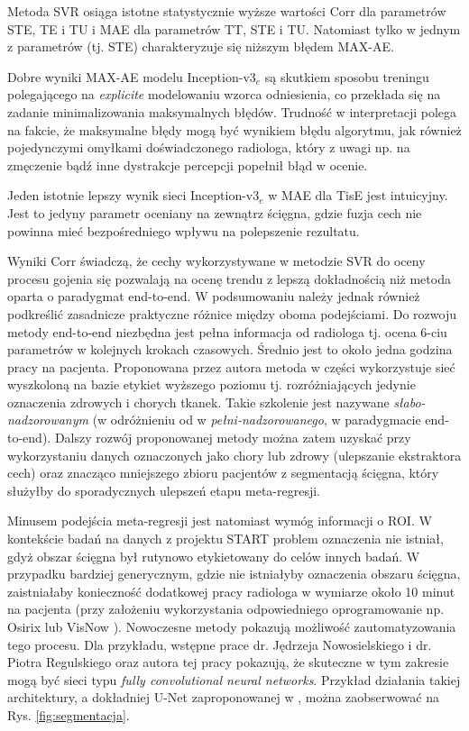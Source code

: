 Metoda SVR osiąga istotne statystycznie wyższe wartości Corr dla parametrów STE, TE i TU i MAE dla parametrów TT, STE i TU. Natomiast tylko w jednym z parametrów (tj. STE) charakteryzuje się niższym błędem MAX-AE. 

Dobre wyniki MAX-AE modelu Inception-v3$_{e}$ są skutkiem sposobu treningu polegającego na \textit{explicite} modelowaniu wzorca odniesienia, co przekłada się na zadanie minimalizowania maksymalnych błędów. Trudność w interpretacji polega na fakcie, że maksymalne błędy mogą być wynikiem błędu algorytmu, jak również pojedynczymi omyłkami doświadczonego radiologa, który z uwagi np. na zmęczenie bądź inne dystrakcje percepcji popełnił błąd w ocenie.

Jeden istotnie lepszy wynik sieci Inception-v3$_e$ w MAE dla TisE jest intuicyjny. Jest to jedyny parametr oceniany na zewnątrz ścięgna, gdzie fuzja cech nie powinna mieć bezpośredniego wpływu na polepszenie rezultatu. 

Wyniki Corr świadczą, że cechy wykorzystywane w metodzie SVR do oceny procesu gojenia się pozwalają na ocenę trendu z lepszą dokładnością niż metoda oparta o paradygmat end-to-end. W podsumowaniu należy jednak również podkreślić zasadnicze praktyczne różnice między oboma podejściami. Do rozwoju metody end-to-end niezbędna jest pełna informacja od radiologa tj. ocena 6-ciu parametrów w kolejnych krokach czasowych. Średnio jest to około jedna godzina pracy na pacjenta. Proponowana przez autora metoda w części wykorzystuje sieć wyszkoloną na bazie etykiet wyższego poziomu tj. rozróżniających jedynie oznaczenia zdrowych i chorych tkanek. Takie szkolenie jest nazywane \textit{słabo-nadzorowanym} (w odróżnieniu od w \textit{pełni-nadzorowanego}, w paradygmacie end-to-end). Dalszy rozwój proponowanej metody można zatem uzyskać przy wykorzystaniu danych oznaczonych jako chory lub zdrowy (ulepszanie ekstraktora cech) oraz znacząco mniejszego zbioru pacjentów z segmentacją ścięgna, który służyłby do sporadycznych ulepszeń etapu meta-regresji. 

Minusem podejścia meta-regresji jest natomiast wymóg informacji o ROI. W kontekście badań na danych z projektu START problem oznaczenia nie istniał, gdyż obszar ścięgna był rutynowo etykietowany do celów innych badań. W przypadku bardziej generycznym, gdzie nie istniałyby oznaczenia obszaru ścięgna, zaistniałaby konieczność dodatkowej pracy radiologa w wymiarze około 10 minut na pacjenta (przy założeniu wykorzystania odpowiedniego oprogramowanie np. Osirix \cite{Rosset2004} lub VisNow \cite{Nowinski_Borucki_2014}). Nowoczesne metody pokazują możliwość zautomatyzowania tego procesu. Dla przykładu, wstępne prace dr. Jędrzeja Nowosielskiego i dr. Piotra Regulskiego oraz autora tej pracy pokazują, że skuteczne w tym zakresie mogą być sieci typu \textit{fully convolutional neural networks}. Przykład działania takiej architektury, a dokładniej U-Net zaproponowanej w \cite{Ronneberger2015}, można zaobserwować na Rys. \ref{fig:segmentacja}. 

